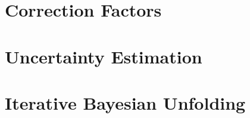 \section{Correction Factors}
    

\section{Uncertainty Estimation}

\section{Iterative Bayesian Unfolding}
    




